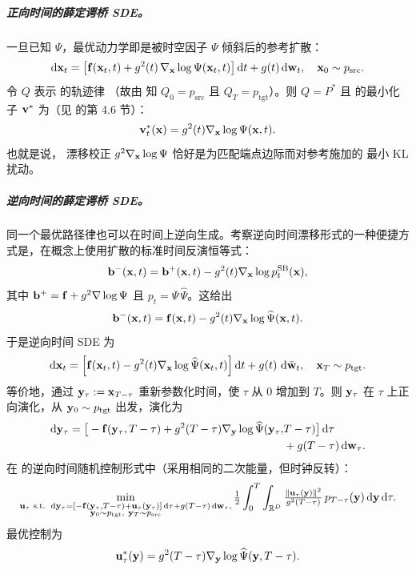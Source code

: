 \subparagraph{正向时间的薛定谔桥 SDE。}
一旦已知 $\Psi$，最优动力学即是被时空因子 $\Psi$ 倾斜后的参考扩散：
\begin{align}\label{eq:sb-forward-sde}
    \mathop{}\!\mathrm{d} {\mathbf{x}}_t = \bigl[{\mathbf{f}}({\mathbf{x}}_t, t) + g^2(t)\,\nabla_{\mathbf{x}} \log \Psi({\mathbf{x}}_t, t)\bigr]\mathop{}\!\mathrm{d} t
+ g(t)\mathop{}\!\mathrm{d} {\mathbf{w}}_t, \quad {\mathbf{x}}_0 \sim p_{\mathrm{src}}.
\end{align}
令 $Q$ 表示  的轨迹律
（故由  知 $Q_0=p_{\mathrm{src}}$ 且 $Q_T=p_{\mathrm{tgt}}$）。则
\emph{$Q=P^*$} 且  的最小化子 ${\mathbf{v}}^*$ 为（见 \citep{chen2021stochastic} 的第 4.6 节）： 
\[
{\mathbf{v}}_t^{*}({\mathbf{x}}) = g^2(t) \nabla_{\mathbf{x}} \log \Psi({\mathbf{x}},t).
\]
也就是说，
漂移校正 $g^2\nabla_{\mathbf{x}}\log\Psi$ 恰好是为匹配端点边际而对参考施加的
最小 KL 扰动。


\subparagraph{逆向时间的薛定谔桥 SDE。}
同一个最优路径律也可以在时间上逆向生成。考察逆向时间漂移形式的一种便捷方式是，在概念上使用扩散的标准时间反演恒等式：
\[
{\mathbf{b}}^{-}({\mathbf{x}},t)={\mathbf{b}}^{+}({\mathbf{x}},t)-g^2(t)\nabla_{\mathbf{x}}\log p_t^{\mathrm{SB}}({\mathbf{x}}),
\]
其中 ${\mathbf{b}}^{+}={\mathbf{f}}+g^2\nabla\log\Psi$ 且 $p_t=\Psi\,\widehat{\Psi}$。这给出
\[
{\mathbf{b}}^{-}({\mathbf{x}},t)={\mathbf{f}}({\mathbf{x}},t)-g^2(t) \nabla_{\mathbf{x}}\log \widehat{\Psi}({\mathbf{x}},t).
\]
于是逆向时间 SDE 为
\begin{align}\label{eq:sb-backward-sde}
\mathop{}\!\mathrm{d} {\mathbf{x}}_t
= \Big[{\mathbf{f}}({\mathbf{x}}_t,t) - g^2(t) \nabla_{{\mathbf{x}}}\log \widehat{\Psi}({\mathbf{x}}_t,t)\Big]\mathop{}\!\mathrm{d} t
+ g(t)\,\mathop{}\!\mathrm{d} \bar{{\mathbf{w}}}_t, \quad {\mathbf{x}}_T \sim p_{\mathrm{tgt}} .
\end{align}
等价地，通过 ${\mathbf{y}}_\tau := {\mathbf{x}}_{T-\tau}$ 重新参数化时间，使
$\tau$ 从 $0$ 增加到 $T$。则 ${\mathbf{y}}_\tau$ 在 $\tau$ 上正向演化，从 ${\mathbf{y}}_0 \sim p_{\mathrm{tgt}}$ 出发，演化为
\begin{align}\label{eq:sb-reverse-forward-tau}
\begin{aligned}
    \mathop{}\!\mathrm{d} {\mathbf{y}}_\tau
= \big[-{\mathbf{f}}({\mathbf{y}}_\tau,T-\tau) + g^2(T-\tau) \nabla_{{\mathbf{y}}}\log \widehat{\Psi}({\mathbf{y}}_\tau,&T-\tau)\big]\mathop{}\!\mathrm{d} \tau
\\&+ g(T-\tau) \mathop{}\!\mathrm{d} {\mathbf{w}}_\tau.
\end{aligned}
\end{align}
在  的逆向时间随机控制形式中（采用相同的二次能量，但时钟反转）：
\begin{align}
\min_{\substack{
{\mathbf{u}}_\tau \text{ s.t. }  
\mathop{}\!\mathrm{d} {\mathbf{y}}_\tau = \left[-{\mathbf{f}}({\mathbf{y}}_\tau,T-\tau)+{\mathbf{u}}_\tau({\mathbf{y}}_\tau)\right]\mathop{}\!\mathrm{d}\tau
+ g(T-\tau) \mathop{}\!\mathrm{d} {\mathbf{w}}_\tau,\\
{\mathbf{y}}_0 \sim p_{\mathrm{tgt}},\ {\mathbf{y}}_T \sim p_{\mathrm{src}}
}}
\tfrac12 \int_{0}^{T} \int_{\mathbb{R}^D} \tfrac{\|{\mathbf{u}}_\tau({\mathbf{y}})\|^2}{g^2(T-\tau)}\,p_{T-\tau}({\mathbf{y}})  \mathop{}\!\mathrm{d}{\mathbf{y}} \mathop{}\!\mathrm{d}\tau .
\end{align}
最优控制为
\[
{\mathbf{u}}_\tau^{*}({\mathbf{y}})=g^2(T-\tau)\nabla_{{\mathbf{y}}}\log\widehat{\Psi}({\mathbf{y}},T-\tau).
\]



